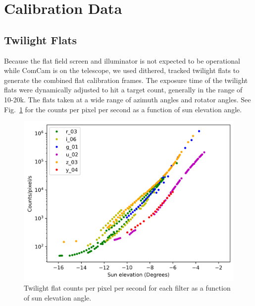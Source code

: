 \section{Calibration Data}
\label{sec:calibration_date}

\subsection{Twilight Flats}

Because the flat field screen and illuminator is not expected to be operational while ComCam is on the telescope, we used dithered, tracked twilight flats to generate the combined flat calibration frames. The exposure time of the twilight flats were dynamically adjusted to hit a target count, generally in the range of 10-20k. The flats taken at a wide range of azimuth angles and rotator angles. See Fig.~\ref{fig:twilight_counts} for the counts per pixel per second as a function of sun elevation angle.

\begin{figure}
  \includegraphics{calibration_data_figures/twilight_flat_counts.png}
  \caption{Twilight flat counts per pixel per second for each filter as a function of sun elevation angle.}
  \label{fig:twilight_counts}
\end{figure}
  